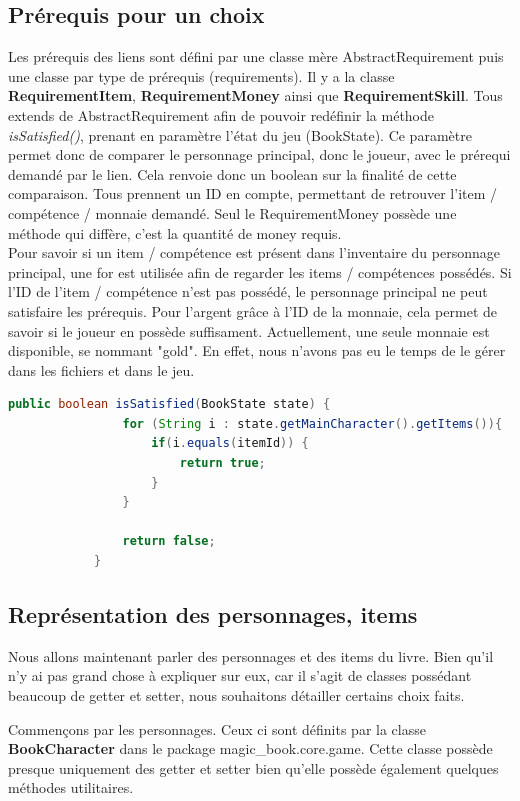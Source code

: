 		\subsection{Prérequis pour un choix}
			Les prérequis des liens sont défini par une classe mère AbstractRequirement puis une classe par type de prérequis (requirements). Il y a la classe \textbf{RequirementItem}, \textbf{RequirementMoney} ainsi que \textbf{RequirementSkill}. Tous extends de AbstractRequirement afin de pouvoir redéfinir la méthode \textit{isSatisfied()}, prenant en paramètre l'état du jeu (BookState). Ce paramètre permet donc de comparer le personnage principal, donc le joueur, avec le prérequi demandé par le lien. Cela renvoie donc un boolean sur la finalité de cette comparaison. Tous prennent un ID en compte, permettant de retrouver l'item / compétence / monnaie demandé. Seul le RequirementMoney possède une méthode qui diffère, c'est la quantité de money requis.\\
			Pour savoir si un item / compétence est présent dans l'inventaire du personnage principal, une for est utilisée afin de regarder les items / compétences possédés. Si l'ID de l'item / compétence n'est pas possédé, le personnage principal ne peut satisfaire les prérequis. Pour l'argent grâce à l'ID de la monnaie, cela permet de savoir si le joueur en possède suffisament. Actuellement, une seule monnaie est disponible, se nommant "gold". En effet, nous n'avons pas eu le temps de le gérer dans les fichiers et dans le jeu.

			\begin{lstlisting}[gobble=12, language=java, caption=exemple de isSatisfied(), label=lst:isSatisfied]
			public boolean isSatisfied(BookState state) {
				for (String i : state.getMainCharacter().getItems()){
					if(i.equals(itemId)) {
						return true;
					}
				}

				return false;
			}
			\end{lstlisting}


		\subsection{Représentation des personnages, items}

			Nous allons maintenant parler des personnages et des items du livre. Bien qu'il n'y ai pas grand chose à expliquer sur eux, car il s'agit de classes possédant beaucoup de getter et setter, nous souhaitons détailler certains choix faits.

			Commençons par les personnages. Ceux ci sont définits par la classe \textbf{BookCharacter} dans le package magic\_book.core.game. Cette classe possède presque uniquement des getter et setter bien qu'elle possède également quelques méthodes utilitaires.

